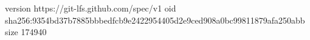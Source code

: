 version https://git-lfs.github.com/spec/v1
oid sha256:9354bd37b7885bbbedfcb9e2422954405d2e9ced908a0bc99811879afa250abb
size 174940
